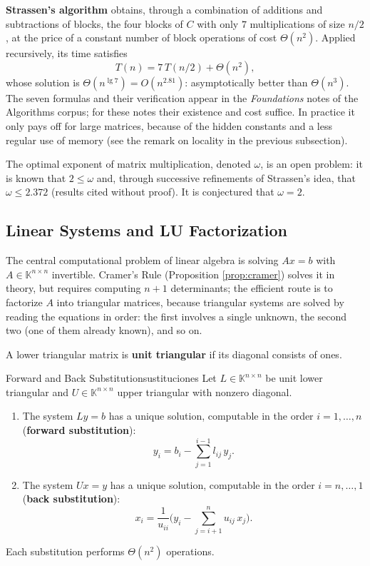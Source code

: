 \documentclass[11pt, a4paper]{article}
\begin{document}
\textbf{Strassen's algorithm} obtains, through a combination of additions and subtractions of blocks, the four blocks of $C$ with only $7$ multiplications of size $n/2$, at the price of a constant number of block operations of cost $\Theta(n^2)$. Applied recursively, its time satisfies
\[
T(n) = 7 \, T(n/2) + \Theta(n^2),
\]
whose solution is $\Theta(n^{\lg 7}) = O(n^{2.81})$: asymptotically better than $\Theta(n^3)$. The seven formulas and their verification appear in the \emph{Foundations} notes of the Algorithms corpus; for these notes their existence and cost suffice. In practice it only pays off for large matrices, because of the hidden constants and a less regular use of memory (see the remark on locality in the previous subsection).

\obs The optimal exponent of matrix multiplication, denoted $\omega$, is an open problem: it is known that $2 \le \omega$ and, through successive refinements of Strassen's idea, that $\omega \le 2.372$ (results cited without proof). It is conjectured that $\omega = 2$.

\subsection{Linear Systems and LU Factorization}

The central computational problem of linear algebra is solving $Ax = b$ with $A \in \mathbb{K}^{n \times n}$ invertible. Cramer's Rule (Proposition \ref{prop:cramer}) solves it in theory, but requires computing $n+1$ determinants; the efficient route is to factorize $A$ into triangular matrices, because triangular systems are solved by reading the equations in order: the first involves a single unknown, the second two (one of them already known), and so on.

A lower triangular matrix is \textbf{unit triangular} if its diagonal consists of ones.

\begin{proposicion}{Forward and Back Substitution}{sustituciones}
Let $L \in \mathbb{K}^{n \times n}$ be unit lower triangular and $U \in \mathbb{K}^{n \times n}$ upper triangular with nonzero diagonal.
\begin{enumerate}
    \item The system $Ly = b$ has a unique solution, computable in the order $i = 1, \dots, n$ (\textbf{forward substitution}):
    \[
    y_i = b_i - \sum_{j=1}^{i-1} l_{ij} \, y_j.
    \]
    \item The system $Ux = y$ has a unique solution, computable in the order $i = n, \dots, 1$ (\textbf{back substitution}):
    \[
    x_i = \frac{1}{u_{ii}} \Big( y_i - \sum_{j=i+1}^{n} u_{ij} \, x_j \Big).
    \]
\end{enumerate}
Each substitution performs $\Theta(n^2)$ operations.
\end{proposicion}
\end{document}
